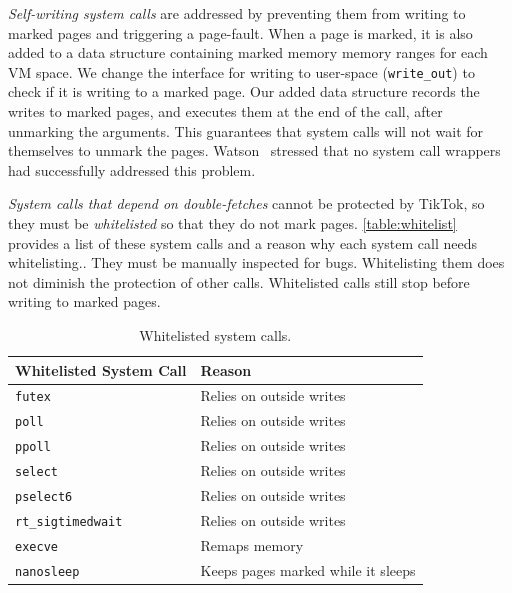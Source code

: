 \documentclass[conference]{IEEEtran}
\newcommand{\sysname}{TikTok}
\begin{document}
\emph{Self-writing system calls} are addressed by preventing them from writing
to marked pages and triggering a page-fault. When a page is marked, it is also
added to a data structure containing marked memory memory ranges for each VM
space. We change the interface for writing to user-space (\texttt{write\_out})
to check if it is writing to a marked page. Our added data structure records the
writes to marked pages, and executes them at the end of the call, after
unmarking the arguments. This guarantees that system calls will not wait for
themselves to unmark the pages.  Watson~\cite{watson2007exploiting} stressed
that no system call wrappers had successfully addressed this problem.

\emph{System calls that depend on double-fetches} cannot be protected by
\sysname{}, so they must be \emph{whitelisted} so that they do not mark
pages. \autoref{table:whitelist} provides a list of these system calls and a
reason why each system call needs whitelisting.. They
must be manually inspected for bugs. Whitelisting them does not diminish the protection
of other calls. Whitelisted calls still stop before writing to marked pages.

\begin{table}[]
  \begin{tabular}{|l|l|}
  \hline
  Whitelisted System Call & Reason                                 \\ \hline
  \texttt{futex}                   & Relies on outside writes               \\ \hline
  \texttt{poll}                    & Relies on outside writes               \\ \hline
  \texttt{ppoll}                   & Relies on outside writes               \\ \hline
  \texttt{select}                  & Relies on outside writes               \\ \hline
  \texttt{pselect6}                & Relies on outside writes               \\ \hline
  \texttt{rt\_sigtimedwait}        & Relies on outside writes               \\ \hline
  \texttt{execve}                  & Remaps memory                          \\ \hline
  \texttt{nanosleep}               & Keeps pages marked while it sleeps \\ \hline
  \end{tabular}
  \caption{Whitelisted system calls.}
  \label{table:whitelist}
  \end{table}
\end{document}
